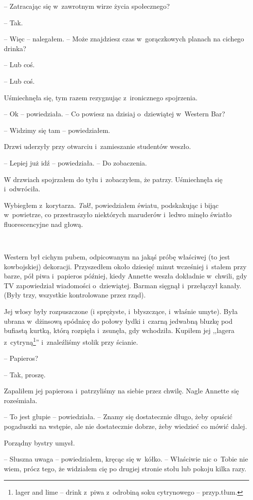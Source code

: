 \documentclass[oneside,polish,11pt,sfheadings]{mwbk}
\begin{document}
-- Zatracając się w~zawrotnym wirze życia społecznego?

-- Tak.

-- Więc -- nalegałem. -- Może znajdziesz czas w~gorączkowych planach na
cichego drinka?

-- Lub coś.

-- Lub coś.

Uśmiechnęła się, tym razem rezygnując z~ironicznego spojrzenia.

-- Ok -- powiedziała. -- Co powiesz na dzisiaj o~dziewiątej w~Western Bar?

-- Widzimy się tam -- powiedziałem.

Drzwi uderzyły przy otwarciu i~zamieszanie studentów weszło.

-- Lepiej już idź -- powiedziała. -- Do zobaczenia.

W drzwiach spojrzałem do tyłu i~zobaczyłem, że patrzy. Uśmiechnęła się i~odwróciła.

Wybiegłem z~korytarza. \emph{Tak}!, powiedziałem światu, podskakując
i bijąc w~powietrze, co przestraszyło niektórych maruderów i~ledwo
minęło światło fluorescencyjne nad głową.

~

Western był cichym pubem, odpicowanym na jakąś próbę właściwej (to jest
kowbojskiej) dekoracji. Przyszedłem około dziesięć minut wcześniej i~stałem przy barze, pół piwa i~papieros później, kiedy Annette weszła
dokładnie w~chwili, gdy TV zapowiedział wiadomości o~dziewiątej. Barman
sięgnął i~przełączył kanały. (Były trzy, wszystkie kontrolowane przez
rząd).

Jej włosy były rozpuszczone (i sprężyste, i~błyszczące, i~właśnie
umyte). Była ubrana w~dżinsową spódnicę do połowy łydki i~czarną
jedwabną bluzkę pod bufiastą kurtką, którą rozpięła i~zsunęła, gdy
wchodziła. Kupiłem jej ,,lagera z~cytryną\footnote{lager and lime -- drink z~piwa z~odrobiną soku cytrynowego -- przyp.tłum.}'' i~znaleźliśmy stolik
przy ścianie.

-- Papieros?

-- Tak, proszę.

Zapaliłem jej papierosa i~patrzyliśmy na siebie przez chwilę. Nagle
Annette się roześmiała.

-- To jest głupie -- powiedziała. -- Znamy się dostatecznie długo, żeby
opuścić pogaduszki na wstępie, ale nie dostatecznie dobrze, żeby
wiedzieć co mówić dalej.

Porządny bystry umysł.

-- Słuszna uwaga -- powiedziałem, kręcąc się w~kółko. -- Właściwie nic o~Tobie nie wiem, prócz tego, że widziałem cię po drugiej stronie stołu
lub pokoju kilka razy.
\end{document}
